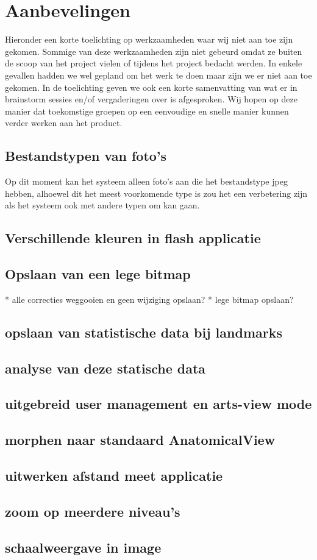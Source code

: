 \section{Aanbevelingen}
\label{Aanbevelingen}
Hieronder een korte toelichting op werkzaamheden waar wij niet aan toe zijn gekomen. Sommige van deze werkzaamheden zijn niet gebeurd omdat ze buiten de scoop van het project vielen of tijdens het project bedacht werden. In enkele gevallen hadden we wel gepland om het werk te doen maar zijn we er niet aan toe gekomen.  In de toelichting geven we ook een korte samenvatting van wat er in brainstorm sessies en/of vergaderingen over is afgesproken. Wij hopen op deze manier dat toekomstige groepen op een eenvoudige en snelle manier kunnen verder werken aan het product.

\subsection{Bestandstypen van foto's}
Op dit moment kan het systeem alleen foto's aan die het bestandstype jpeg hebben, alhoewel dit het meest voorkomende type is zou het een verbetering zijn als het systeem ook met andere typen om kan gaan.

\subsection{Verschillende kleuren in flash applicatie}

\subsection{Opslaan van een lege bitmap}
* alle correcties weggooien en geen wijziging opslaan?
* lege bitmap opslaan?

\subsection{opslaan van statistische data bij landmarks}

\subsection{analyse van deze statische data}

\subsection{uitgebreid user management en arts-view mode}

\subsection{morphen naar standaard AnatomicalView}

\subsection{uitwerken afstand meet applicatie}

\subsection{zoom op meerdere niveau's}

\subsection{schaalweergave in image}
